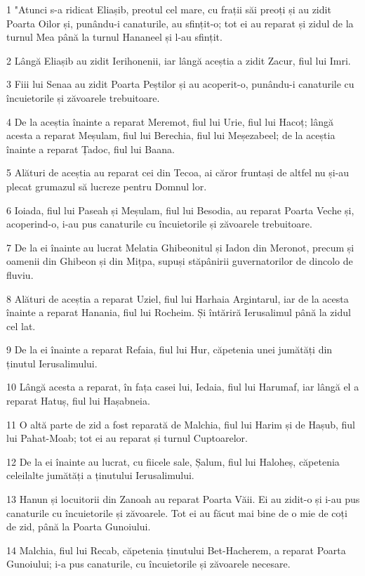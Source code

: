 \par 1 "Atunci s-a ridicat Eliașib, preotul cel mare, cu frații săi preoți și au zidit Poarta Oilor și, punându-i canaturile, au sfințit-o; tot ei au reparat și zidul de la turnul Mea până la turnul Hananeel și l-au sfințit.
\par 2 Lângă Eliașib au zidit Ierihonenii, iar lângă aceștia a zidit Zacur, fiul lui Imri.
\par 3 Fiii lui Senaa au zidit Poarta Peștilor și au acoperit-o, punându-i canaturile cu încuietorile și zăvoarele trebuitoare.
\par 4 De la aceștia înainte a reparat Meremot, fiul lui Urie, fiul lui Hacoț; lângă acesta a reparat Meșulam, fiul lui Berechia, fiul lui Meșezabeel; de la aceștia înainte a reparat Țadoc, fiul lui Baana.
\par 5 Alături de aceștia au reparat cei din Tecoa, ai căror fruntași de altfel nu și-au plecat grumazul să lucreze pentru Domnul lor.
\par 6 Ioiada, fiul lui Paseah și Meșulam, fiul lui Besodia, au reparat Poarta Veche și, acoperind-o, i-au pus canaturile cu încuietorile și zăvoarele trebuitoare.
\par 7 De la ei înainte au lucrat Melatia Ghibeonitul și Iadon din Meronot, precum și oamenii din Ghibeon și din Mițpa, supuși stăpânirii guvernatorilor de dincolo de fluviu.
\par 8 Alături de aceștia a reparat Uziel, fiul lui Harhaia Argintarul, iar de la acesta înainte a reparat Hanania, fiul lui Rocheim. Și întăriră Ierusalimul până la zidul cel lat.
\par 9 De la ei înainte a reparat Refaia, fiul lui Hur, căpetenia unei jumătăți din ținutul Ierusalimului.
\par 10 Lângă acesta a reparat, în fața casei lui, Iedaia, fiul lui Harumaf, iar lângă el a reparat Hatuș, fiul lui Hașabneia.
\par 11 O altă parte de zid a fost reparată de Malchia, fiul lui Harim și de Hașub, fiul lui Pahat-Moab; tot ei au reparat și turnul Cuptoarelor.
\par 12 De la ei înainte au lucrat, cu fiicele sale, Șalum, fiul lui Haloheș, căpetenia celeilalte jumătăți a ținutului Ierusalimului.
\par 13 Hanun și locuitorii din Zanoah au reparat Poarta Văii. Ei au zidit-o și i-au pus canaturile cu încuietorile și zăvoarele. Tot ei au făcut mai bine de o mie de coți de zid, până la Poarta Gunoiului.
\par 14 Malchia, fiul lui Recab, căpetenia ținutului Bet-Hacherem, a reparat Poarta Gunoiului; i-a pus canaturile, cu încuietorile și zăvoarele necesare.
